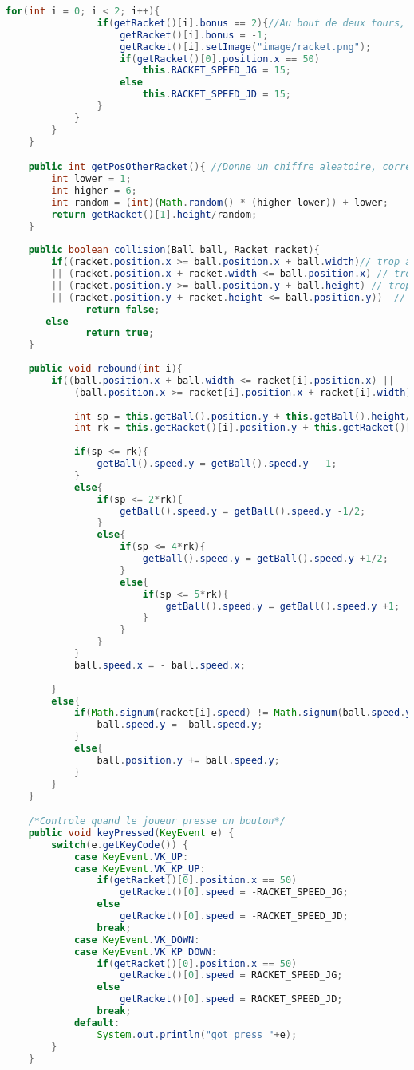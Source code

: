 \begin{lstlisting}[language=Java]
			for(int i = 0; i < 2; i++){
				if(getRacket()[i].bonus == 2){//Au bout de deux tours, les bonus disparaissent
					getRacket()[i].bonus = -1;
					getRacket()[i].setImage("image/racket.png");
					if(getRacket()[0].position.x == 50)
						this.RACKET_SPEED_JG = 15;
					else
						this.RACKET_SPEED_JD = 15;
				}
			}
		}
	}

	public int getPosOtherRacket(){ //Donne un chiffre aleatoire, correspondant a une raquette coupe en 5 
		int lower = 1;
		int higher = 6;
		int random = (int)(Math.random() * (higher-lower)) + lower;
		return getRacket()[1].height/random;
	}
	
	public boolean collision(Ball ball, Racket racket){
		if((racket.position.x >= ball.position.x + ball.width)// trop a droite
	    || (racket.position.x + racket.width <= ball.position.x) // trop a gauche
	    || (racket.position.y >= ball.position.y + ball.height) // trop en bas
	    || (racket.position.y + racket.height <= ball.position.y))  // trop en haut
	          return false; 
	   else
		   	  return true;
	}
	
	public void rebound(int i){ 
		if((ball.position.x + ball.width <= racket[i].position.x) ||
			(ball.position.x >= racket[i].position.x + racket[i].width) ){
			
			int sp = this.getBall().position.y + this.getBall().height/2;
			int rk = this.getRacket()[i].position.y + this.getRacket()[i].height/5;       
		
			if(sp <= rk){
				getBall().speed.y = getBall().speed.y - 1;
			}
			else{
				if(sp <= 2*rk){
					getBall().speed.y = getBall().speed.y -1/2;
				}
				else{
					if(sp <= 4*rk){
						getBall().speed.y = getBall().speed.y +1/2;
					}
					else{
						if(sp <= 5*rk){
							getBall().speed.y = getBall().speed.y +1;
						}
					}
				}
			}
			ball.speed.x = - ball.speed.x;
				
		}
		else{			
			if(Math.signum(racket[i].speed) != Math.signum(ball.speed.y)){
				ball.speed.y = -ball.speed.y;
			}
			else{
				ball.position.y += ball.speed.y;
			}
		}
	}

	/*Controle quand le joueur presse un bouton*/
	public void keyPressed(KeyEvent e) {
		switch(e.getKeyCode()) {
			case KeyEvent.VK_UP:
			case KeyEvent.VK_KP_UP:
				if(getRacket()[0].position.x == 50)
					getRacket()[0].speed = -RACKET_SPEED_JG;
				else
					getRacket()[0].speed = -RACKET_SPEED_JD;
				break;
			case KeyEvent.VK_DOWN:
			case KeyEvent.VK_KP_DOWN:
				if(getRacket()[0].position.x == 50)
					getRacket()[0].speed = RACKET_SPEED_JG;
				else
					getRacket()[0].speed = RACKET_SPEED_JD;
				break;
			default:
				System.out.println("got press "+e);
		}
	}
	

\end{lstlisting}
